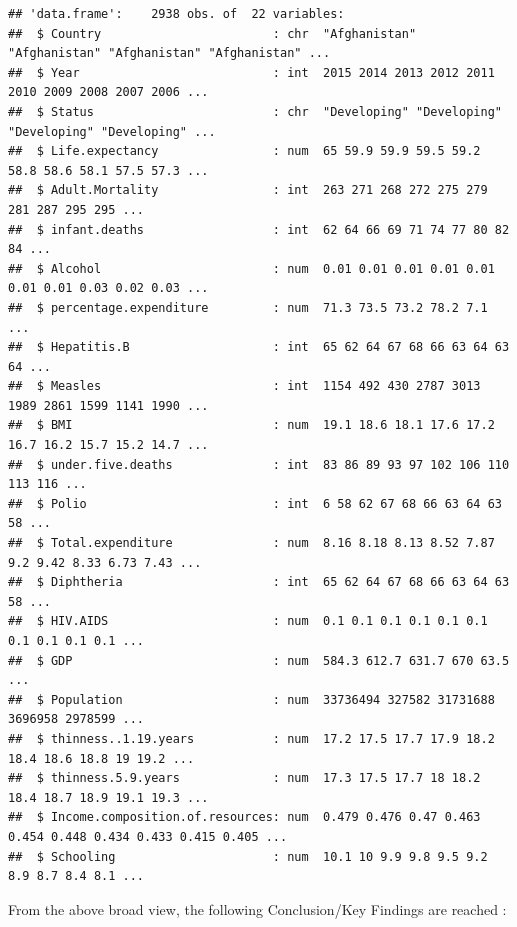 \documentclass[
]{article}
\begin{document}
\begin{verbatim}
## 'data.frame':    2938 obs. of  22 variables:
##  $ Country                        : chr  "Afghanistan" "Afghanistan" "Afghanistan" "Afghanistan" ...
##  $ Year                           : int  2015 2014 2013 2012 2011 2010 2009 2008 2007 2006 ...
##  $ Status                         : chr  "Developing" "Developing" "Developing" "Developing" ...
##  $ Life.expectancy                : num  65 59.9 59.9 59.5 59.2 58.8 58.6 58.1 57.5 57.3 ...
##  $ Adult.Mortality                : int  263 271 268 272 275 279 281 287 295 295 ...
##  $ infant.deaths                  : int  62 64 66 69 71 74 77 80 82 84 ...
##  $ Alcohol                        : num  0.01 0.01 0.01 0.01 0.01 0.01 0.01 0.03 0.02 0.03 ...
##  $ percentage.expenditure         : num  71.3 73.5 73.2 78.2 7.1 ...
##  $ Hepatitis.B                    : int  65 62 64 67 68 66 63 64 63 64 ...
##  $ Measles                        : int  1154 492 430 2787 3013 1989 2861 1599 1141 1990 ...
##  $ BMI                            : num  19.1 18.6 18.1 17.6 17.2 16.7 16.2 15.7 15.2 14.7 ...
##  $ under.five.deaths              : int  83 86 89 93 97 102 106 110 113 116 ...
##  $ Polio                          : int  6 58 62 67 68 66 63 64 63 58 ...
##  $ Total.expenditure              : num  8.16 8.18 8.13 8.52 7.87 9.2 9.42 8.33 6.73 7.43 ...
##  $ Diphtheria                     : int  65 62 64 67 68 66 63 64 63 58 ...
##  $ HIV.AIDS                       : num  0.1 0.1 0.1 0.1 0.1 0.1 0.1 0.1 0.1 0.1 ...
##  $ GDP                            : num  584.3 612.7 631.7 670 63.5 ...
##  $ Population                     : num  33736494 327582 31731688 3696958 2978599 ...
##  $ thinness..1.19.years           : num  17.2 17.5 17.7 17.9 18.2 18.4 18.6 18.8 19 19.2 ...
##  $ thinness.5.9.years             : num  17.3 17.5 17.7 18 18.2 18.4 18.7 18.9 19.1 19.3 ...
##  $ Income.composition.of.resources: num  0.479 0.476 0.47 0.463 0.454 0.448 0.434 0.433 0.415 0.405 ...
##  $ Schooling                      : num  10.1 10 9.9 9.8 9.5 9.2 8.9 8.7 8.4 8.1 ...
\end{verbatim}

From the above broad view, the following Conclusion/Key Findings are
reached :
\end{document}
